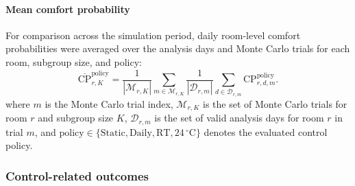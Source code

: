 \paragraph{Mean comfort probability}
For comparison across the simulation period, daily room-level comfort probabilities were averaged over the analysis days and Monte Carlo trials for each room, subgroup size, and policy:
\begin{equation}
\overline{\mathrm{CP}}_{r,K}^{\mathrm{policy}}
=
\frac{1}{|\mathcal{M}_{r,K}|}
\sum_{m\in\mathcal{M}_{r,K}}
\frac{1}{|\mathcal{D}_{r,m}|}
\sum_{d\in\mathcal{D}_{r,m}}
\mathrm{CP}_{r,d,m}^{\mathrm{policy}} .
\end{equation}
where $m$ is the Monte Carlo trial index, $\mathcal{M}_{r,K}$ is the set of Monte Carlo trials for room $r$ and subgroup size $K$, $\mathcal{D}_{r,m}$ is the set of valid analysis days for room $r$ in trial $m$, and $\mathrm{policy}\in\{\mathrm{Static},\mathrm{Daily},\mathrm{RT},24\,^\circ\mathrm{C}\}$ denotes the evaluated control policy.

\subsubsection{Control-related outcomes}

